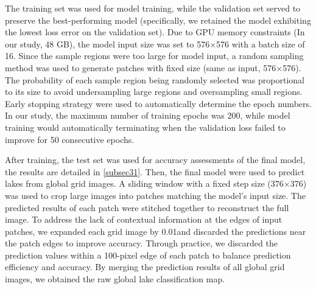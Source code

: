 \documentclass[preprint,12pt,authoryear]{elsarticle}
\begin{document}
The training set was used for model training, while the validation set served to preserve the best-performing model (specifically, we retained the model exhibiting the lowest loss error on the validation set). Due to GPU memory constraints (In our study, 48 GB), the model input size was set to 576×576 with a batch size of 16. Since the sample regions were too large for model input, a random sampling method was used to generate patches with fixed size (same as input, 576×576). The probability of each sample region being randomly selected was proportional to its size to avoid undersampling large regions and oversampling small regions. Early stopping strategy were used to automatically determine the epoch numbers. In our study, the maximum number of training epochs was 200, while model training would automatically terminating when the validation loss failed to improve for 50 consecutive epochs.

After training, the test set was used for accuracy assessments of the final model, the results are detailed in \ref{subsec31}. Then, the final model were used to predict lakes from global grid images. A sliding window with a fixed step size (376×376) was used to crop large images into patches matching the model's input size. The predicted results of each patch were stitched together to reconstruct the full image. To address the lack of contextual information at the edges of input patches, we expanded each grid image by 0.01\degree and discarded the predictions near the patch edges to improve accuracy. Through practice, we discarded the prediction values within a 100-pixel edge of each patch to balance prediction efficiency and accuracy. By merging the prediction results of all global grid images, we obtained the raw global lake classification map.
\end{document}
